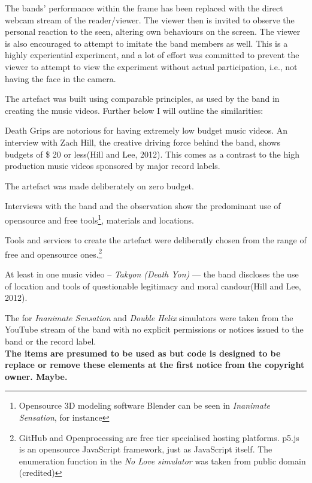\documentclass[a4paper, 11pt]{article}
\begin{document}
 The bands’ performance within the frame has been replaced with the direct webcam stream of the reader/viewer. The viewer then is invited to observe the personal reaction to the seen, altering own behaviours on the screen. The viewer is also encouraged to attempt to imitate the band members as well. This is a highly experiential experiment, and a lot of effort was committed to prevent the viewer to attempt to view the experiment without actual participation, i.e., not having the face in the camera.

The artefact was built using comparable principles, as used by the band in creating the music videos. Further below I will outline the similarities:


\begin{description}[align=right]
	\item [band]
Death Grips are notorious for having extremely low budget music videos. An interview with Zach Hill, the creative driving force behind the band, shows budgets of \$ 20 or less(Hill and Lee, 2012). This comes as a contrast to the high production music videos sponsored by major record labels.

	\item[artefact]
The artefact was made deliberately on zero budget.

	\item [band]
Interviews with the band and the observation show the predominant use of opensource and free tools\footnote{Opensource 3D modeling software Blender can be seen in \textit{Inanimate Sensation}, for instance}, materials and locations.

	\item [artefact]
Tools and services to create the artefact were deliberatly chosen from the range of free and opensource ones.\footnote{GitHub and Openprocessing are free tier specialised hosting platforms. p5.js is an opensource JavaScript framework, just as JavaScript itself. The enumeration function in the \textit{No Love simulator} was taken from public domain (credited)}

	\item [band]
At least in one music video – \textit{Takyon (Death Yon)} — the band discloses the use of location and tools of questionable legitimacy and moral candour(Hill and Lee, 2012).

	\item [artefact]
The  for \textit{Inanimate Sensation} and \textit{Double Helix} simulators were taken from the YouTube stream of the band with no explicit permissions or notices issued to the band or the record label.\\ \textbf{The items are presumed to be used as  but code is designed to be replace or remove these elements at the first notice from the copyright owner. Maybe.}


\end{description}
\end{document}
